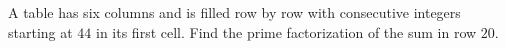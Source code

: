 A table has six columns and is filled row by row with consecutive integers starting at $44$ in its first cell. Find the prime factorization of the sum in row $20$.
